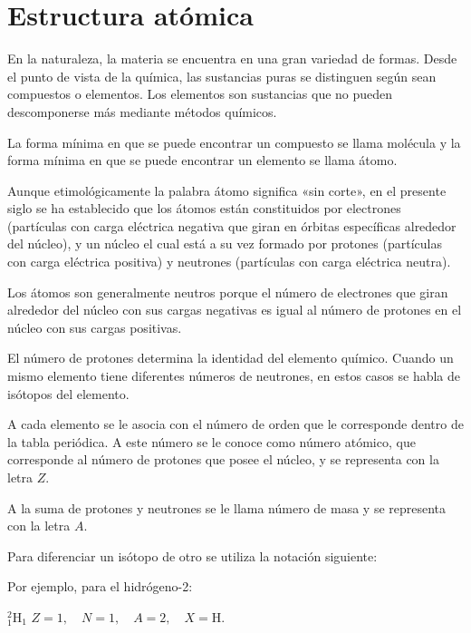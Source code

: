 \chapter{Estructura atómica}

En la naturaleza, la materia se encuentra en una gran variedad de formas. Desde el punto de vista de la química, las sustancias puras se distinguen según sean compuestos o elementos. Los elementos son sustancias que no pueden descomponerse más mediante métodos químicos.

La forma mínima en que se puede encontrar un compuesto se llama molécula y la forma mínima en que se puede encontrar un elemento se llama átomo.

Aunque etimológicamente la palabra átomo significa «sin corte», en el presente siglo se ha establecido que los átomos están constituidos por electrones (partículas con carga eléctrica negativa que giran en órbitas específicas alrededor del núcleo), y un núcleo el cual está a su vez formado por protones (partículas con carga eléctrica positiva) y neutrones (partículas con carga eléctrica neutra).

Los átomos son generalmente neutros porque el número de electrones que giran alrededor del núcleo con sus cargas negativas es igual al número de protones en el núcleo con sus cargas positivas.

El número de protones determina la identidad del elemento químico. Cuando un mismo elemento tiene diferentes números de neutrones, en estos casos se habla de isótopos del elemento.

A cada elemento se le asocia con el número de orden que le corresponde dentro de la tabla periódica. A este número se le conoce como número atómico, que corresponde al número de protones que posee el núcleo, y se representa con la letra $Z$.

A la suma de protones y neutrones se le llama número de masa y se representa con la letra $A$.

Para diferenciar un isótopo de otro se utiliza la notación siguiente:

\begin{center}
\end{center}

Por ejemplo, para el hidrógeno-2:
\begin{center}
  {\huge $\displaystyle{}^{2}_{1}\mathrm{H}_{1}$}
  \qquad $Z=1,\quad N=1,\quad A=2,\quad X=\mathrm{H}$.
\end{center}
